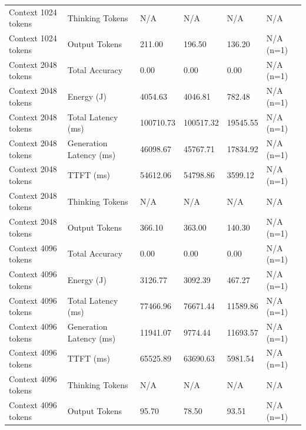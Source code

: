 \begin{table}
\begin{tabular}{llllll}
Context 1024 tokens & Thinking Tokens & N/A & N/A & N/A & N/A \\
Context 1024 tokens & Output Tokens & 211.00 & 196.50 & 136.20 & N/A (n=1) \\
Context 2048 tokens & Total Accuracy & 0.00 & 0.00 & 0.00 & N/A (n=1) \\
Context 2048 tokens & Energy (J) & 4054.63 & 4046.81 & 782.48 & N/A (n=1) \\
Context 2048 tokens & Total Latency (ms) & 100710.73 & 100517.32 & 19545.55 & N/A (n=1) \\
Context 2048 tokens & Generation Latency (ms) & 46098.67 & 45767.71 & 17834.92 & N/A (n=1) \\
Context 2048 tokens & TTFT (ms) & 54612.06 & 54798.86 & 3599.12 & N/A (n=1) \\
Context 2048 tokens & Thinking Tokens & N/A & N/A & N/A & N/A \\
Context 2048 tokens & Output Tokens & 366.10 & 363.00 & 140.30 & N/A (n=1) \\
Context 4096 tokens & Total Accuracy & 0.00 & 0.00 & 0.00 & N/A (n=1) \\
Context 4096 tokens & Energy (J) & 3126.77 & 3092.39 & 467.27 & N/A (n=1) \\
Context 4096 tokens & Total Latency (ms) & 77466.96 & 76671.44 & 11589.86 & N/A (n=1) \\
Context 4096 tokens & Generation Latency (ms) & 11941.07 & 9774.44 & 11693.57 & N/A (n=1) \\
Context 4096 tokens & TTFT (ms) & 65525.89 & 63690.63 & 5981.54 & N/A (n=1) \\
Context 4096 tokens & Thinking Tokens & N/A & N/A & N/A & N/A \\
Context 4096 tokens & Output Tokens & 95.70 & 78.50 & 93.51 & N/A (n=1) \\
\bottomrule
\end{tabular}
\end{table}
